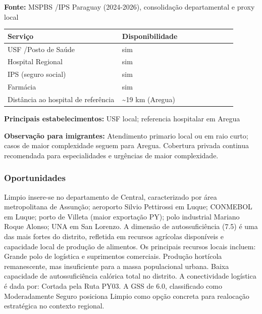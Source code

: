 \textbf{Fonte:} MSPBS /\allowbreak  IPS Paraguay (2024-2026), consolidação
departamental e proxy local

{\def\LTcaptype{none} %
\begin{longtable}{@{}>{\raggedright\arraybackslash}p{0.45\linewidth} >{\raggedright\arraybackslash}p{0.45\linewidth}@{}}
\toprule\noalign{}
Serviço & Disponibilidade \\
\midrule\noalign{}
\endhead
\bottomrule\noalign{}
\endlastfoot
USF /\allowbreak  Posto de Saúde & sim \\
Hospital Regional & sim \\
IPS (seguro social) & sim \\
Farmácia & sim \\
Distância ao hospital de referência & \textasciitilde19 km (Aregua) \\
\end{longtable}
}

\textbf{Principais estabelecimentos:} USF local; referencia hospitalar
em Aregua

\textbf{Observação para imigrantes:} Atendimento primario local ou em
raio curto; casos de maior complexidade seguem para Aregua. Cobertura
privada continua recomendada para especialidades e urgências de maior
complexidade.
\newpage

\subsubsection*{Oportunidades}\label{oport-limpio-1108}
Limpio insere-se no departamento de Central, caracterizado por área metropolitana de Assunção; aeroporto Silvio Pettirossi em Luque; CONMEBOL em Luque; porto de Villeta (maior exportação PY); polo industrial Mariano Roque Alonso; UNA em San Lorenzo. A dimensão de autossuficiência (7.5) é uma das mais fortes do distrito, refletida em recursos agrícolas disponíveis e capacidade local de produção de alimentos. Os principais recursos locais incluem: Grande polo de logística e suprimentos comerciais. Produção hortícola remanescente, mas insuficiente para a massa populacional urbana. Baixa capacidade de autossuficiência calórica total no distrito. A conectividade logística é dada por: Cortada pela Ruta PY03. A GSS de 6.0, classificado como Moderadamente Seguro posiciona Limpio como opção concreta para realocação estratégica no contexto regional.

